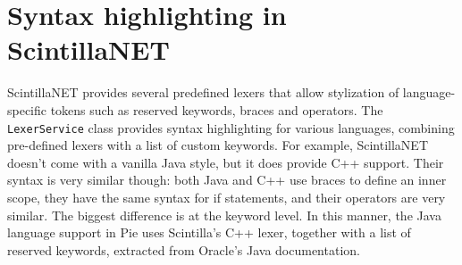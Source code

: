 \section{Syntax highlighting in ScintillaNET}

ScintillaNET provides several predefined lexers that allow stylization of language-specific tokens such as reserved keywords, braces and operators. The \texttt{LexerService} class provides syntax highlighting for various languages, combining pre-defined lexers with a list of custom keywords. For example, ScintillaNET doesn't come with a vanilla Java style, but it does provide C++ support. Their syntax is very similar though: both Java and C++ use braces to define an inner scope, they have the same syntax for if statements, and their operators are very similar. The biggest difference is at the keyword level. In this manner, the Java language support in Pie uses Scintilla's C++ lexer, together with a list of reserved keywords, extracted from Oracle's Java documentation.

